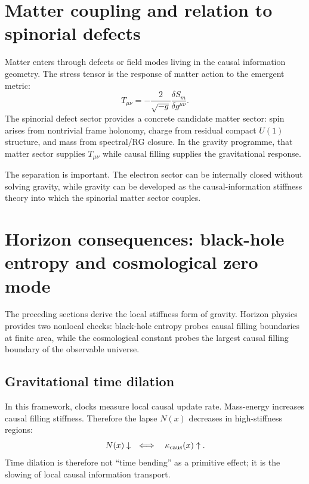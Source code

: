 \documentclass[11pt]{article}
\begin{document}
\section{Matter coupling and relation to spinorial defects}

Matter enters through defects or field modes living in the causal information geometry. The stress tensor is the response of matter action to the emergent metric:
\begin{equation}
T_{\mu\nu}=-\frac{2}{\sqrt{-g}}\frac{\delta S_m}{\delta g^{\mu\nu}}.
\end{equation}
The spinorial defect sector provides a concrete candidate matter sector: spin arises from nontrivial frame holonomy, charge from residual compact $U(1)$ structure, and mass from spectral/RG closure. In the gravity programme, that matter sector supplies $T_{\mu\nu}$ while causal filling supplies the gravitational response.

The separation is important. The electron sector can be internally closed without solving gravity, while gravity can be developed as the causal-information stiffness theory into which the spinorial matter sector couples.


\section{Horizon consequences: black-hole entropy and cosmological zero mode}

The preceding sections derive the local stiffness form of gravity. Horizon physics provides two nonlocal checks: black-hole entropy probes causal filling boundaries at finite area, while the cosmological constant probes the largest causal filling boundary of the observable universe.

\subsection{Gravitational time dilation}

In this framework, clocks measure local causal update rate. Mass-energy increases causal filling stiffness. Therefore the lapse $N(x)$ decreases in high-stiffness regions:
\begin{equation}
N(x)\downarrow \quad\Longleftrightarrow\quad \kappa_{\rm caus}(x)\uparrow.
\end{equation}
Time dilation is therefore not ``time bending'' as a primitive effect; it is the slowing of local causal information transport.
\end{document}

